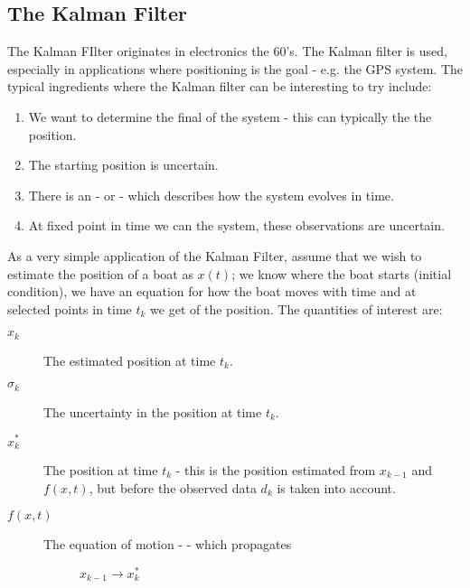 \documentclass[letterpaper,10pt,english]{sphinxmanual}
\begin{document}
\subsection{The Kalman Filter}
\label{\detokenize{introduction/index:the-kalman-filter}}
The Kalman FIlter originates in electronics the 60’s. The Kalman filter is
 used, especially in applications where positioning is the goal - e.g.
the GPS system. The typical ingredients where the Kalman filter can be
interesting to try include:
\begin{enumerate}
\item {} 
We want to determine the final  of the system - this can typically the
the position.

\item {} 
The starting position is uncertain.

\item {} 
There is an  - or  - which describes how
the system evolves in time.

\item {} 
At fixed point in time we can  the system, these observations are
uncertain.

\end{enumerate}

As a very simple application of the Kalman Filter, assume that we wish to
estimate the position of a boat as \(x(t)\); we know where the boat starts
(initial condition), we have an equation for how the boat moves with time and at
selected points in time \(t_k\) we get  of the position. The
quantities of interest are:
\begin{description}
\item[{\(x_k\)}] \leavevmode
The estimated position at time \(t_k\).

\item[{\(\sigma_k\)}] \leavevmode
The uncertainty in the position at time \(t_k\).

\item[{\(x_k^{\ast}\)}] \leavevmode
The  position at time \(t_k\) -
this is the position estimated from \(x_{k-1}\) and \(f(x,t)\), but
before the observed data \(d_k\) is taken into account.

\item[{\(f(x,t)\)}] \leavevmode\begin{description}
\item[{The equation of motion -  - which propagates}] \leavevmode
\(x_{k-1} \to x_k^{\ast}\)

\end{description}

\end{description}
\end{document}
